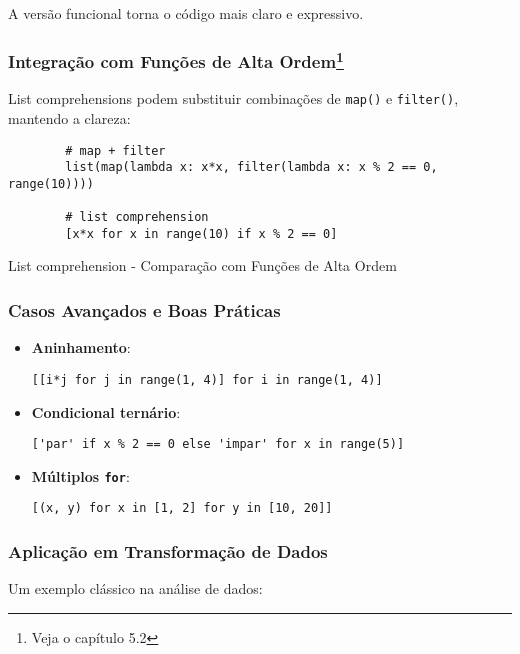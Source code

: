 A versão funcional torna o código mais claro e expressivo.
\subsubsection{Integração com Funções de Alta Ordem\footnote{Veja o capítulo 5.2}}
List comprehensions podem substituir combinações de \texttt{map()} e \texttt{filter()}, mantendo a clareza:

\begin{listing}[!ht]
    \begin{verbatim}
        # map + filter
        list(map(lambda x: x*x, filter(lambda x: x % 2 == 0, range(10))))

        # list comprehension
        [x*x for x in range(10) if x % 2 == 0]
    \end{verbatim}
    \caption{List comprehension - Comparação com Funções de Alta Ordem}
    \label{listing:2}
\end{listing}

\subsubsection{Casos Avançados e Boas Práticas}
\begin{itemize}
\item \textbf{Aninhamento}:
\begin{verbatim}
[[i*j for j in range(1, 4)] for i in range(1, 4)]
\end{verbatim}
\item \textbf{Condicional ternário}:
\begin{verbatim}
['par' if x % 2 == 0 else 'impar' for x in range(5)]
\end{verbatim}
\item \textbf{Múltiplos \texttt{for}}:
\begin{verbatim}
[(x, y) for x in [1, 2] for y in [10, 20]]
\end{verbatim}
\end{itemize}

\subsubsection{Aplicação em Transformação de Dados}
Um exemplo clássico na análise de dados:

